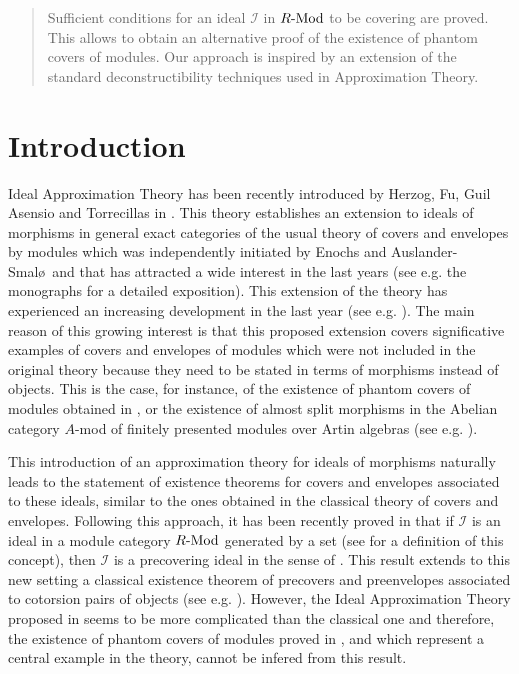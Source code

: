 \documentclass[11pt]{amsart}
\begin{document}
{

\begin{abstract}
Sufficient conditions for an ideal $\mathcal I$ in $R{\textrm{-}{\rm Mod}}$ to be covering are proved. This allows to obtain an alternative proof of the existence of phantom covers of modules. Our approach is inspired by an extension of the standard deconstructibility techniques used in Approximation Theory.
\end{abstract}

\maketitle

\section{Introduction}
Ideal Approximation Theory has been recently introduced by Herzog, Fu, Guil Asensio and Torrecillas in \cite{FGHT}. This theory establishes an extension to ideals of morphisms in general exact categories of the usual theory of covers and envelopes by modules which was independently initiated by Enochs and Auslander-Smal\o\ and that has attracted a wide interest in the last years (see e.g. the monographs \cite{BR,EO, GT,Xu} for a detailed exposition). This extension of the theory has experienced an increasing development in the last year (see e.g. \cite{FGHT2,FH,FH2}).
The main reason of this growing interest is that this proposed extension covers significative examples of covers and envelopes of modules which were not included in the original theory because they need to be stated in terms of morphisms instead of objects. This is the case, for instance, of the existence of phantom covers of modules obtained in \cite{Herzog1}, or the existence of almost split morphisms in the Abelian category $A$-mod of finitely presented modules over Artin algebras (see e.g. \cite{ARS}).  

This introduction of an approximation theory for ideals of morphisms naturally leads to the statement of existence theorems for covers and envelopes associated to these ideals, similar to the ones obtained in the classical theory of covers and envelopes. 
Following this approach, it has been recently proved in \cite{Ozbek} that if $\mathcal I$ is an ideal in a module category $R{\textrm{-}{\rm Mod}}$ generated by a set (see \cite{Ozbek} for a definition of this concept), 
then $\mathcal{I}$ is a precovering ideal in the sense of \cite{FGHT}. 
This result extends to this new setting a classical existence theorem of precovers and preenvelopes associated to cotorsion pairs of objects (see e.g. \cite{GT}). However, the Ideal Approximation Theory proposed in \cite{FGHT} seems to be more complicated than the classical one and therefore, the existence of phantom covers of modules proved in \cite{Herzog1}, and which represent a central example in the theory, cannot be infered from this result.

}
\end{document}
